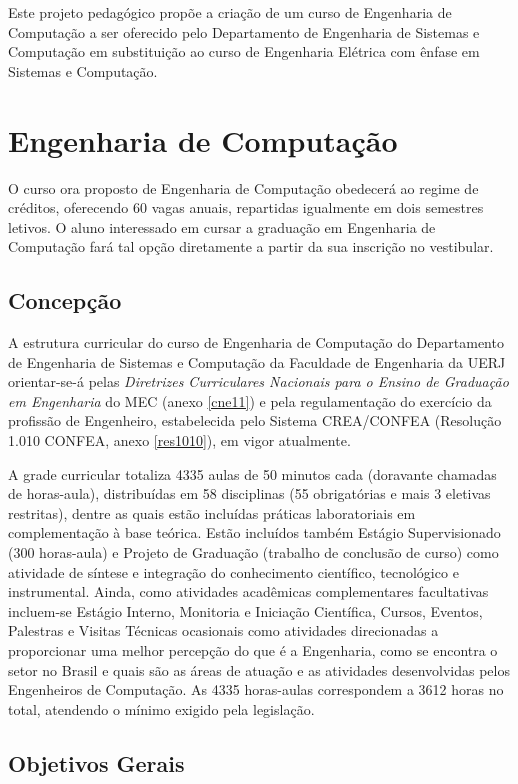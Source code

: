 Este projeto pedagógico propõe a criação de um curso de Engenharia de Computação a ser oferecido pelo Departamento de Engenharia de Sistemas e Computação em substituição ao curso de Engenharia Elétrica com ênfase em Sistemas e Computação.

\chapter{Engenharia de Computação}
O curso ora proposto de Engenharia de Computação obedecerá ao regime de créditos, oferecendo 60 vagas anuais, repartidas igualmente em dois semestres letivos. O aluno interessado em cursar a graduação em Engenharia de Computação fará tal opção diretamente a partir da sua inscrição no vestibular.

\section{Concepção}

A estrutura curricular do curso de Engenharia de Computação do Departamento de Engenharia de Sistemas e Computação da Faculdade de Engenharia da UERJ orientar-se-á pelas \textit{Diretrizes Curriculares Nacionais para o Ensino de Graduação em Engenharia} do MEC (anexo \ref{cne11}) e pela regulamentação do exercício da profissão de Engenheiro, estabelecida pelo Sistema CREA/CONFEA (Resolução 1.010 CONFEA, anexo \ref{res1010}), em vigor atualmente. 

A grade curricular totaliza 4335 aulas de 50 minutos cada (doravante chamadas de horas-aula), distribuídas em 58 disciplinas (55 obrigatórias e mais 3 eletivas restritas), dentre as quais estão incluídas práticas laboratoriais em complementação à base teórica. Estão incluídos também Estágio Supervisionado (300 horas-aula) e Projeto de Graduação (trabalho de conclusão de curso) como atividade de síntese e integração do conhecimento científico, tecnológico e instrumental. Ainda, como atividades acadêmicas complementares facultativas incluem-se Estágio Interno, Monitoria e Iniciação Científica, Cursos, Eventos, Palestras e Visitas Técnicas ocasionais como atividades direcionadas a proporcionar uma melhor percepção do que é a Engenharia, como se encontra o setor no Brasil e quais são as áreas de atuação e as atividades desenvolvidas pelos Engenheiros de Computação. As 4335 horas-aulas correspondem a 3612 horas no total, atendendo o mínimo exigido pela legislação. 

\section{Objetivos Gerais}

